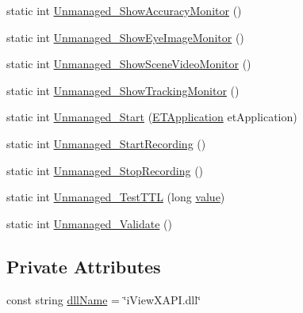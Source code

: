 \begin{DoxyCompactItemize}
\item 
static int \hyperlink{class_web_analyzer_1_1_eye_tracking_1_1_eye_tracking_controller_ae7f70abd98a4334a8df3190eb1de6e8d}{Unmanaged\+\_\+\+Show\+Accuracy\+Monitor} ()
\item 
static int \hyperlink{class_web_analyzer_1_1_eye_tracking_1_1_eye_tracking_controller_af1d27214e9a1c10d85e5de2d3fe6de20}{Unmanaged\+\_\+\+Show\+Eye\+Image\+Monitor} ()
\item 
static int \hyperlink{class_web_analyzer_1_1_eye_tracking_1_1_eye_tracking_controller_afc67a7e356368738f77eb79274ec7c45}{Unmanaged\+\_\+\+Show\+Scene\+Video\+Monitor} ()
\item 
static int \hyperlink{class_web_analyzer_1_1_eye_tracking_1_1_eye_tracking_controller_a9ee835599abfd4570b0d715e8e9dabd5}{Unmanaged\+\_\+\+Show\+Tracking\+Monitor} ()
\item 
static int \hyperlink{class_web_analyzer_1_1_eye_tracking_1_1_eye_tracking_controller_a6a0a46155ddfe780eed6e60c8652ba90}{Unmanaged\+\_\+\+Start} (\hyperlink{class_web_analyzer_1_1_eye_tracking_1_1_eye_tracking_controller_a839adfe010efe26bdf87089a43e7c1d4}{E\+T\+Application} et\+Application)
\item 
static int \hyperlink{class_web_analyzer_1_1_eye_tracking_1_1_eye_tracking_controller_a077770ecec95783d919393a0d582c8c0}{Unmanaged\+\_\+\+Start\+Recording} ()
\item 
static int \hyperlink{class_web_analyzer_1_1_eye_tracking_1_1_eye_tracking_controller_ae7497b15d074e24e8c2bf5e51dc617fb}{Unmanaged\+\_\+\+Stop\+Recording} ()
\item 
static int \hyperlink{class_web_analyzer_1_1_eye_tracking_1_1_eye_tracking_controller_a7e61817848e81b00e6a9dc2418c9b9b6}{Unmanaged\+\_\+\+Test\+T\+T\+L} (long \hyperlink{_u_i_2_h_t_m_l_resources_2js_2lib_2underscore_8min_8js_af7e1471ab89699458c4df8bb657298f6}{value})
\item 
static int \hyperlink{class_web_analyzer_1_1_eye_tracking_1_1_eye_tracking_controller_ab9cabc57e75454dd06abdcfd467e0e83}{Unmanaged\+\_\+\+Validate} ()
\end{DoxyCompactItemize}
\subsection*{Private Attributes}
\begin{DoxyCompactItemize}
\item 
const string \hyperlink{class_web_analyzer_1_1_eye_tracking_1_1_eye_tracking_controller_a3d379c5e2e4fe3eb39090973223e79a8}{dll\+Name} = \char`\"{}i\+View\+X\+A\+P\+I.\+dll\char`\"{}
\end{DoxyCompactItemize}


